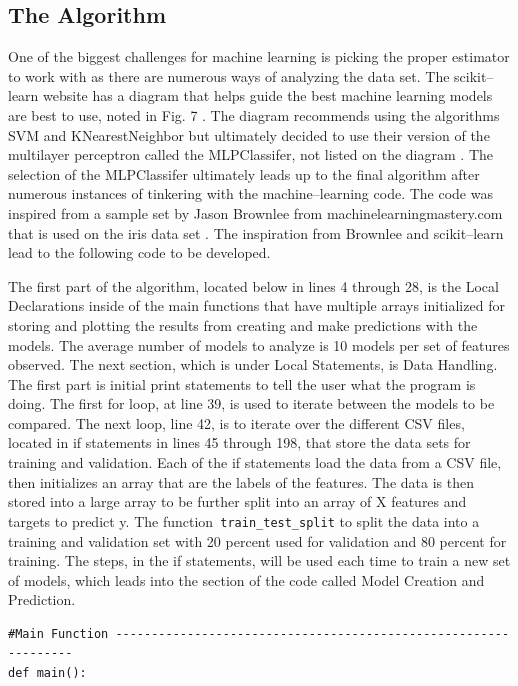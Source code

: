 \documentclass[a4paper, 12pt]{article}
\begin{document}
\subsection{The Algorithm}
\begin{paragraph}
\indent One of the biggest challenges for machine learning is picking the proper estimator to work with as there are numerous ways of analyzing the data set. The scikit--learn website has a diagram that helps guide the best machine learning models are best to use, noted in Fig. 7 \cite{SciKit}. The diagram recommends using the algorithms SVM and KNearestNeighbor but ultimately decided to use their version of the multilayer perceptron called the MLPClassifer, not listed on the diagram \cite{SciKit}. The selection of the MLPClassifer ultimately leads up to the final algorithm after numerous instances of tinkering with the machine--learning code. The code was inspired from a sample set by Jason Brownlee from machinelearningmastery.com that is used on the iris data set \cite{MLMaster}. The inspiration from Brownlee and scikit--learn lead to the following code to be developed. 

\par
\indent The first part of the algorithm, located below in lines 4 through 28, is the Local Declarations inside of the main functions that have multiple arrays initialized for storing and plotting the results from creating and make predictions with the models. The average number of models to analyze is 10 models per set of features observed. The next section, which is under Local Statements, is Data Handling. The first part is initial print statements to tell the user what the program is doing. The first for loop, at line 39, is used to iterate between the models to be compared. The next loop, line 42, is to iterate over the different CSV files, located in if statements in lines 45 through 198, that store the data sets for training and validation. Each of the if statements load the data from a CSV file, then initializes an array that are the labels of the features. The data is then stored into a large array to be further split into an array of X features and targets to predict y. The function\texttt{ train\_test\_split} to split the data into a training and validation set with 20 percent used for validation and 80 percent for training. The steps, in the if statements, will be used each time to train a new set of models, which leads into the section of the code called Model Creation and Prediction.
\newline
\begin{lstlisting}[frame = single]
#Main Function ----------------------------------------------------------------
def main():


\end{lstlisting}
\end{paragraph}
\end{document}
